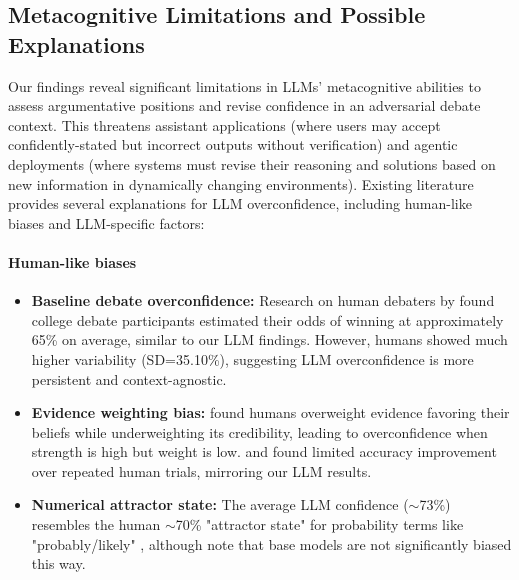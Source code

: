\documentclass{article}
\begin{document}
\subsection{Metacognitive Limitations and Possible Explanations}
\label{subsec:metacognitive_limitations}

Our findings reveal significant limitations in LLMs' metacognitive abilities to assess argumentative positions and revise confidence in an adversarial debate context. This threatens assistant applications (where users may accept confidently-stated but incorrect outputs without verification) and agentic deployments (where systems must revise their reasoning and solutions based on new information in dynamically changing environments). Existing literature provides several explanations for LLM overconfidence, including human-like biases and LLM-specific factors:

\paragraph{Human-like biases}
\begin{itemize}
    \item \textbf{Baseline debate overconfidence:} Research on human debaters by \citet{RePEc:sip:dpaper:06-042} found college debate participants estimated their odds of winning at approximately 65\% on average, similar to our LLM findings. However, humans showed much higher variability (SD=35.10\%), suggesting LLM overconfidence is more persistent and context-agnostic.

    \item \textbf{Evidence weighting bias:} \citet{GriffinTversky1992} found humans overweight evidence favoring their beliefs while underweighting its credibility, leading to overconfidence when strength is high but weight is low. \citet{Moore2008} and \citet{RePEc:sip:dpaper:06-042} found limited accuracy improvement over repeated human trials, mirroring our LLM results.

    \item \textbf{Numerical attractor state:} The average LLM confidence ($\sim$73\%) resembles the human $\sim$70\% "attractor state" for probability terms like "probably/likely" \citep{Hashim2024,Mandel2019}, although \citep{west2025basemodelsbeataligned,openai2024gpt4technicalreport} note that base models are not significantly biased this way.
\end{itemize}
\end{document}
